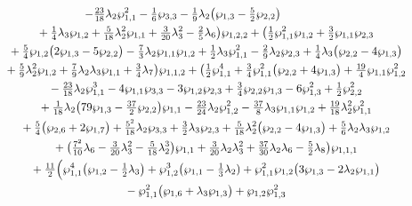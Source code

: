 \documentclass[pdftex]{sigma}
\numberwithin{equation}{section}
\begin{document}
\begin{gather*}
 - \tfrac{23}{18} \lambda_2 \wp_{1,1}^2 - \tfrac{1}{6} \wp_{3,3}
 - \tfrac{1}{9} \lambda_2 \big(\wp_{1,3} - \tfrac{5}{2} \wp_{2,2}\big) \\
\hphantom{\mathcal{P}_{11}(u) =}{} + \tfrac{1}{4} \lambda_3 \wp_{1,2} + \tfrac{5}{18} \lambda_2^2 \wp_{1,1} + \tfrac{3}{20} \lambda_3^2 - \tfrac{2}{5} \lambda_6\big) \wp_{1,2,2}
 + \big(\tfrac{1}{2} \wp_{1,1}^2 \wp_{1,2} + \tfrac{3}{2} \wp_{1,1} \wp_{2,3} \\
\hphantom{\mathcal{P}_{11}(u) =}{} + \tfrac{5}{4} \wp_{1,2} \big(2 \wp_{1,3} - 5 \wp_{2,2} \big) - \tfrac{7}{3} \lambda_2 \wp_{1,1} \wp_{1,2} + \tfrac{1}{2} \lambda_3 \wp_{1,1}^2 - \tfrac{2}{9} \lambda_2 \wp_{2,3}
 + \tfrac{1}{4} \lambda_3 \big(\wp_{2,2} - 4\wp_{1,3}\big) \\
\hphantom{\mathcal{P}_{11}(u) =}{} + \tfrac{5}{9} \lambda_2^2 \wp_{1,2} + \tfrac{7}{9} \lambda_2 \lambda_3 \wp_{1,1} + \tfrac{3}{4} \lambda_7 \big) \wp_{1,1,2} + \big(\tfrac{1}{2} \wp_{1,1}^4 + \tfrac{3}{4} \wp_{1,1}^2 \big(\wp_{2,2} + 4\wp_{1,3}\big) + \tfrac{19}{4} \wp_{1,1} \wp_{1,2}^2\\
\hphantom{\mathcal{P}_{11}(u) =}{} - \tfrac{23}{18} \lambda_2 \wp_{1,1}^3 - 4 \wp_{1,1} \wp_{3,3} - 3 \wp_{1,2} \wp_{2,3} + \tfrac{3}{4} \wp_{2,2} \wp_{1,3} - 6 \wp_{1,3}^2 + \tfrac{1}{2} \wp_{2,2}^2\\
\hphantom{\mathcal{P}_{11}(u) =}{}
 + \tfrac{1}{18} \lambda_2 \big(79 \wp_{1,3} - \tfrac{37}{2} \wp_{2,2}\big) \wp_{1,1}
 - \tfrac{23}{24} \lambda_2 \wp_{1,2}^2
 - \tfrac{37}{8} \lambda_3 \wp_{1,1} \wp_{1,2} + \tfrac{19}{18} \lambda_2^2 \wp_{1,1}^2 \\
\hphantom{\mathcal{P}_{11}(u) =}{}
 + \tfrac{5}{4} \big(\wp_{2,6} + 2 \wp_{1,7} \big) + \tfrac{5^2}{18} \lambda_2 \wp_{3,3} + \tfrac{3}{2} \lambda_3 \wp_{2,3} + \tfrac{5}{18} \lambda_2^2 \big(\wp_{2,2} - 4 \wp_{1,3}\big)
 + \tfrac{5}{6} \lambda_2 \lambda_3 \wp_{1,2} \\
\hphantom{\mathcal{P}_{11}(u) =}{}
 + \big(\tfrac{7^2}{10} \lambda_6 - \tfrac{3}{20} \lambda_3^2 - \tfrac{5}{18} \lambda_2^3\big) \wp_{1,1}
 + \tfrac{3}{20} \lambda_2 \lambda_3^2 + \tfrac{37}{30} \lambda_2 \lambda_6 - \tfrac{5}{2} \lambda_8\big) \wp_{1,1,1}\\
\hphantom{\mathcal{P}_{11}(u) =}{}
 + \tfrac{11}{2} \Big(\wp_{1,1}^4 \big(\wp_{1,2} - \tfrac{1}{2}\lambda_3\big) + \wp_{1,2}^3 \big(\wp_{1,1} - \tfrac{1}{3} \lambda_2) + \wp_{1,1}^2 \wp_{1,2} \big(3\wp_{1,3} - 2 \lambda_2 \wp_{1,1} \big) \\
\hphantom{\mathcal{P}_{11}(u) =}{}
 - \wp_{1,1}^2 \big(\wp_{1,6} + \lambda_3 \wp_{1,3} \big) + \wp_{1,2} \wp_{1,3}^2

\end{gather*}
\end{document}
